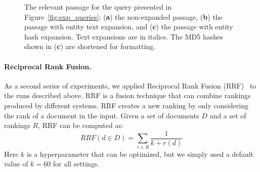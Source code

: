 \begin{figure}
	\caption{The relevant passage for the query presented in Figure~\ref{fig:exp_queries}; (\textbf{a}) the non-expanded passage, (\textbf{b}) the passage with entity text expansion, and (\textbf{c}) the passage with entity hash expansion. Text expansions are in italics. The MD5 hashes shown in (\textbf{c}) are shortened for formatting.}
	\label{fig:exp_passage}
\end{figure}


\paragraph{Reciprocal Rank Fusion.} As a second series of experiments, we applied Reciprocal Rank Fusion (RRF)~\citep{10.1145/1571941.1572114} to the runs described above. RRF is a fusion technique that can combine rankings produced by different systems. RRF creates a new ranking by only considering the rank of a document in the input. Given a set of documents $D$ and a set of rankings $R$, RRF can be computed as: 
\begin{equation}
	\mathit{RRF}(d \in D) = \sum_{r\in R}\frac{1}{k + r(d)}
\end{equation}
Here $k$ is a hyperparameter that can be optimized, but we simply used a default value of $k=60$ for all settings.

